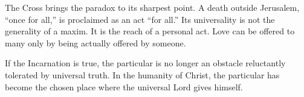 The Cross brings the paradox to its sharpest point. A death outside Jerusalem, ``once for all,'' is proclaimed as an act ``for all.'' Its universality is not the generality of a maxim. It is the reach of a personal act. Love can be offered to many only by being actually offered by someone.

If the Incarnation is true, the particular is no longer an obstacle reluctantly tolerated by universal truth. In the humanity of Christ, the particular has become the chosen place where the universal Lord gives himself.
